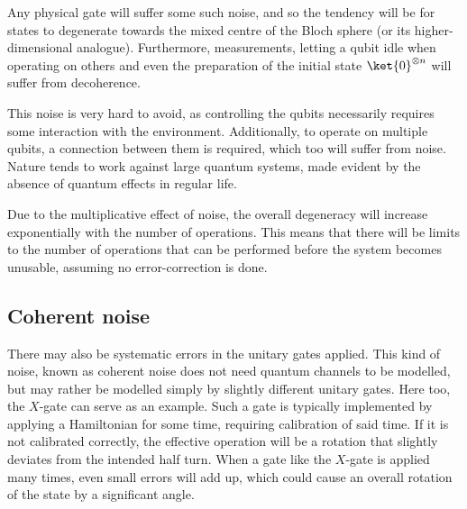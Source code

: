 Any physical gate will suffer some such noise, and so the tendency will be for states to degenerate towards the mixed centre of the Bloch sphere (or its higher-dimensional analogue).
Furthermore, measurements, letting a qubit idle when operating on others and even the preparation of the initial state $\ket{0}^{\otimes n}$ will suffer from decoherence.

This noise is very hard to avoid, as controlling the qubits necessarily requires some interaction with the environment.
Additionally, to operate on multiple qubits, a connection between them is required, which too will suffer from noise.
Nature tends to work against large quantum systems, made evident by the absence of quantum effects in regular life.

Due to the multiplicative effect of noise, the overall degeneracy will increase exponentially with the number of operations.
This means that there will be limits to the number of operations that can be performed before the system becomes unusable, assuming no error-correction is done.

\subsection{Coherent noise}
There may also be systematic errors in the unitary gates applied.
This kind of noise, known as coherent noise does not need quantum channels to be modelled, but may rather be modelled simply by slightly different unitary gates.
Here too, the $X$-gate can serve as an example.
Such a gate is typically implemented by applying a Hamiltonian for some time, requiring calibration of said time.
%
If it is not calibrated correctly, the effective operation will be a rotation that slightly deviates from the intended half turn.
When a gate like the $X$-gate is applied many times, even small errors will add up, which could cause an overall rotation of the state by a significant angle.

